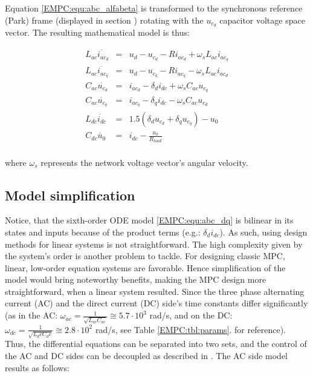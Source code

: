     Equation \ref{EMPC:equ:abc_alfabeta} is transformed to the synchronous reference (Park) frame (displayed in section ) rotating with the $u_{c_d}$ capacitor voltage space vector. The resulting mathematical model is thus:

    \begin{equation}
        \begin{array}{rcl}
            L_{ac}\dot{i_{ac_d}}&=&u_d-u_{c_d}-Ri_{ac_d}+\omega_s L_{ac}i_{ac_q}\\
            L_{ac}\dot{i_{ac_q}}&=&u_d-u_{c_q}-Ri_{ac_q}-\omega_s L_{ac}i_{ac_d}\\
            C_{ac}\dot{u_{c_d}}&=&i_{ac_d}-\delta_di_{dc}+\omega_s C_{ac}u_{c_q}\\
            C_{ac}\dot{u_{c_q}}&=&i_{ac_q}-\delta_qi_{dc}-\omega_s C_{ac}u_{c_d}\\
            L_{dc}\dot{i_{dc}}&=&1.5(\delta_d u_{c_d}+\delta_q u_{c_q})-u_0\\
            C_{dc}\dot{u_0}&=&i_{dc}-\frac{u_0}{R_{load}}\\
        \end{array}
        \label{EMPC:equ:abc_dq}
    \end{equation}

    where $\omega_s$ represents the network voltage vector’s angular velocity.

    \subsection{Model simplification}\label{EMPC:sec:Simplification}

    Notice, that the sixth-order ODE model \ref{EMPC:equ:abc_dq} is bilinear in its states and
    inputs because of the product terms (e.g.: $\delta_di_{dc}$). As such, using design methods for linear systems is not straightforward. The high complexity given by the system’s order is another problem to tackle. For designing classic MPC, linear, low-order equation systems are favorable. Hence simplification of the model would bring noteworthy benefits, making the MPC design more straightforward, when a linear system resulted.
    Since the three phase alternating current (AC) and the direct current (DC) side’s time constants differ significantly (as in the AC: $\omega_{ac}=\frac{1}{\sqrt{L_{ac} C_{ac}}}\cong5.7\cdot10^3$ rad/s, and on the DC: $\omega_{dc}=\frac{1}{\sqrt{L_dc C_dc}}\cong2.8\cdot10^2$ rad/s, see Table \ref{EMPC:tbl:params}. for reference). Thus, the differential equations can be separated into two sets, and the control of the AC and DC sides can be decoupled as described in \cite{ahmed2014model}. The AC side model results as follows:


